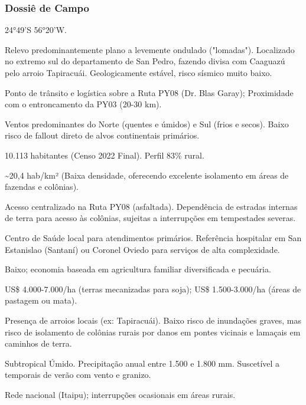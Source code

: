 \subsubsection{Dossiê de Campo}
\begin{description}[style=nextline,leftmargin=0.5cm,font=\bfseries]
\item[Coordenadas]  24°49'S 56°20'W.
\item[Topografia]  Relevo predominantemente plano a levemente ondulado ("lomadas"). Localizado no extremo sul do departamento de San Pedro, fazendo divisa com Caaguazú pelo arroio Tapiracuái. Geologicamente estável, risco sísmico muito baixo.
\item[Alvos Estratégicos]  Ponto de trânsito e logística sobre a Ruta PY08 (Dr. Blas Garay); Proximidade com o entroncamento da PY03 (20-30 km).
\item[Fallout]  Ventos predominantes do Norte (quentes e úmidos) e Sul (frios e secos). Baixo risco de fallout direto de alvos continentais primários.
\item[População]  10.113 habitantes (Censo 2022 Final). Perfil 83\% rural.
\item[Densidade]  \textasciitilde 20,4 hab/\allowbreak km² (Baixa densidade, oferecendo excelente isolamento em áreas de fazendas e colônias).
\item[Vias de Acesso]  Acesso centralizado na Ruta PY08 (asfaltada). Dependência de estradas internas de terra para acesso às colônias, sujeitas a interrupções em tempestades severas.
\item[Serviços]  Centro de Saúde local para atendimentos primários. Referência hospitalar em San Estanislao (Santaní) ou Coronel Oviedo para serviços de alta complexidade.
\item[Custo de Vida]  Baixo; economia baseada em agricultura familiar diversificada e pecuária.
\item[Preço da Terra]  US\$ 4.000-7.000/\allowbreak ha (terras mecanizadas para soja); US\$ 1.500-3.000/\allowbreak ha (áreas de pastagem ou mata).
\item[Hidrologia]  Presença de arroios locais (ex: Tapiracuái). Baixo risco de inundações graves, mas risco de isolamento de colônias rurais por danos em pontes vicinais e lamaçais em caminhos de terra.
\item[Clima]  Subtropical Úmido. Precipitação anual entre 1.500 e 1.800 mm. Suscetível a temporais de verão com vento e granizo.
\item[Energia]  Rede nacional (Itaipu); interrupções ocasionais em áreas rurais.

\end{description}
